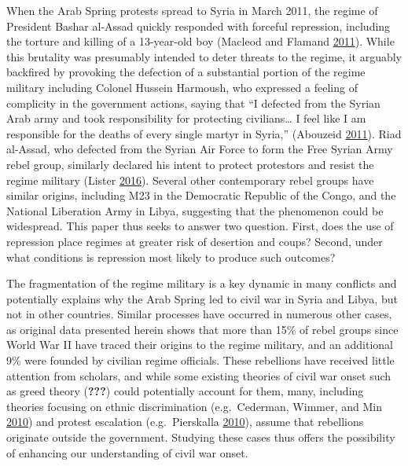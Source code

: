 \documentclass[
  12pt,
]{article}
\begin{document}
When the Arab Spring protests spread to Syria in March 2011, the regime of President Bashar al-Assad quickly responded with forceful repression, including the torture and killing of a 13-year-old boy (Macleod and Flamand \protect\hyperlink{ref-Macleod2011}{2011}). While this brutality was presumably intended to deter threats to the regime, it arguably backfired by provoking the defection of a substantial portion of the regime military including Colonel Hussein Harmoush, who expressed a feeling of complicity in the government actions, saying that ``I defected from the Syrian Arab army and took responsibility for protecting civilians\ldots{} I feel like I am responsible for the deaths of every single martyr in Syria,'' (Abouzeid \protect\hyperlink{ref-Abouzeid2011}{2011}). Riad al-Assad, who defected from the Syrian Air Force to form the Free Syrian Army rebel group, similarly declared his intent to protect protestors and resist the regime military (Lister \protect\hyperlink{ref-Lister2016}{2016}). Several other contemporary rebel groups have similar origins, including M23 in the Democratic Republic of the Congo, and the National Liberation Army in Libya, suggesting that the phenomenon could be widespread. This paper thus seeks to answer two question. First, does the use of repression place regimes at greater risk of desertion and coups? Second, under what conditions is repression most likely to produce such outcomes?

The fragmentation of the regime military is a key dynamic in many conflicts and potentially explains why the Arab Spring led to civil war in Syria and Libya, but not in other countries. Similar processes have occurred in numerous other cases, as original data presented herein shows that more than 15\% of rebel groups since World War II have traced their origins to the regime military, and an additional 9\% were founded by civilian regime officials. These rebellions have received little attention from scholars, and while some existing theories of civil war onset such as greed theory ({\textbf{???}}) could potentially account for them, many, including theories focusing on ethnic discrimination (e.g.~Cederman, Wimmer, and Min \protect\hyperlink{ref-Cederman2010}{2010}) and protest escalation (e.g.~Pierskalla \protect\hyperlink{ref-Pierskalla2010}{2010}), assume that rebellions originate outside the government. Studying these cases thus offers the possibility of enhancing our understanding of civil war onset.
\end{document}
